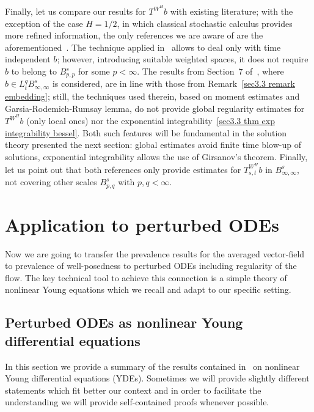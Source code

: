 \documentclass[10pt]{article}
\begin{document}
\begin{remark}
  \label{sec3.3 rem comparison}Finally, let us compare our results for
  $T^{W^H} b$ with existing literature; with the exception of the case $H = 1
  / 2$, in which classical stochastic calculus provides more refined
  information, the only references we are aware of are the
  aforementioned~{\cite{catelliergubinelli,le}}. The technique applied
  in~{\cite{catelliergubinelli}} allows to deal only with time independent
  $b$; however, introducing suitable weighted spaces, it does not require $b$
  to belong to $B^s_{p, p}$ for some $p < \infty$. The results from Section~7
  of~{\cite{le}}, where $b \in L^q_t B^s_{\infty, \infty}$ is considered, are
  in line with those from Remark~\ref{sec3.3 remark embedding}; still, the
  techniques used therein, based on moment estimates and
  Garsia-Rodemich-Rumsay lemma, do not provide global regularity estimates for
  $T^{W^H} b$ (only local ones) nor the exponential
  integrability~{\eqref{sec3.3 thm exp integrability bessel}}. Both such
  features will be fundamental in the solution theory presented the next
  section: global estimates avoid finite time blow-up of solutions,
  exponential integrability allows the use of Girsanov's theorem. Finally, let
  us point out that both references only provide estimates for $T_{s, t}^{W^H}
  b$ in $B^s_{\infty, \infty}$, not covering other scales $B^s_{p, q}$ with
  $p, q < \infty$.
\end{remark}

\section{Application to perturbed ODEs}\label{sec4}

Now we are going to transfer the prevalence results for the averaged
vector-field to prevalence of well-posedness to perturbed ODEs including
regularity of the flow. The key technical tool to achieve this connection is a
simple theory of nonlinear Young equations which we recall and adapt to our
specific setting.

\subsection{Perturbed ODEs as nonlinear Young differential
equations}\label{sec4.1}

In this section we provide a summary of the results contained
in~{\cite{catelliergubinelli}} on nonlinear Young differential equations
(YDEs). Sometimes we will provide slightly different statements which fit
better our context and in order to facilitate the understanding we will
provide self-contained proofs whenever possible.
\end{document}
